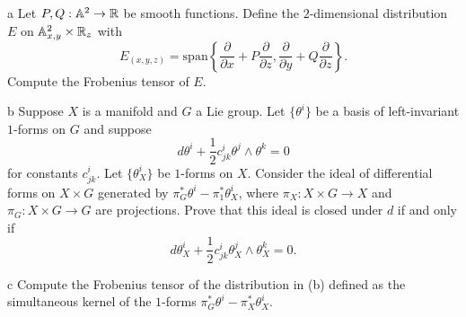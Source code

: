 \documentclass{../../templates/lkx_pset}
\begin{document}
\begin{parts}
	\begin{part}{a}
		Let $P,Q: \mathbb{A}^2 \to \mathbb{R}$ be smooth functions. Define the $2$-dimensional distribution $E$ on $\mathbb{A}^2_{x,y}\times \mathbb{R}_z$ with
		\[
			E_{(x,y,z)} = \textrm{span}\left\{\frac{\partial}{\partial x} + P \frac{\partial}{\partial z}, \frac{\partial}{\partial y} + Q \frac{\partial}{\partial z}\right\}.
		\]
		Compute the Frobenius tensor of $E$.
	\end{part}

	\begin{part}{b}
		Suppose $X$ is a manifold and $G$ a Lie group. Let $\{\theta^i\}$ be a basis of left-invariant $1$-forms on $G$ and suppose
		\[
			d\theta^i + \frac{1}{2}c^i_{jk} \theta^j\wedge \theta^k = 0
		\]
		for constants $c^i_{jk}$. Let $\{\theta^i_X\}$ be $1$-forms on $X$. Consider the ideal of differential forms on $X\times G$ generated by $\pi_G^*\theta^i - \pi^*_1 \theta^i_X$, where $\pi_X : X \times G \to X$ and $\pi_G : X\times G \to G$ are projections. Prove that this ideal is closed under $d$ if and only if
		\[
			d\theta^i_X + \frac{1}{2}c^i_{jk} \theta^j_X \wedge \theta^k_X = 0.
		\]
	\end{part}

	\begin{part}{c}
		Compute the Frobenius tensor of the distribution in (b) defined as the simultaneous kernel of the $1$-forms $\pi_G^*\theta^i - \pi_X^*\theta^i_X$.
	\end{part}
\end{parts}
\end{document}
